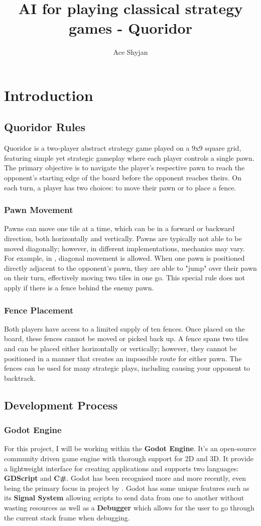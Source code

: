 \documentclass[review]{cmpreport}
\title{AI for playing classical strategy games - Quoridor}
\author{Ace Shyjan}
\begin{document}
\section{Introduction}

\subsection{Quoridor Rules}
Quoridor is a two-player abstract strategy game played on a 9x9 square grid, featuring simple yet strategic gameplay where each player controls a single pawn. The primary objective is to navigate the player's respective pawn to reach the opponent’s starting edge of the board before the opponent reaches theirs. On each turn, a player has two choices: to move their pawn or to place a fence.

\subsubsection{Pawn Movement}
Pawns can move one tile at a time, which can be in a forward or backward direction, both horizontally and vertically. Pawns are typically not able to be moved diagonally; however, in different implementations, mechanics may vary. For example, in \cite{glendenning2005mastering}, diagonal movement is allowed. When one pawn is positioned directly adjacent to the opponent's pawn, they are able to "jump" over their pawn on their turn, effectively moving two tiles in one go. This special rule does not apply if there is a fence behind the enemy pawn.

\subsubsection{Fence Placement}
Both players have access to a limited supply of ten fences. Once placed on the board, these fences cannot be moved or picked back up. A fence spans two tiles and can be placed either horizontally or vertically; however, they cannot be positioned in a manner that creates an impossible route for either pawn. The fences can be used for many strategic plays, including causing your opponent to backtrack.

\subsection{Development Process}
\subsubsection{Godot Engine}
For this project, I will be working within the \textbf{Godot Engine}. It's an open-source community driven game engine with thorough support for 2D and 3D. It provide a lightweight interface for creating applications and supports two languages: \textbf{GDScript} and \textbf{C\#}. Godot has been recognised more and more recently, even being the primary focus in project by \cite{salmela2022game}. Godot has some unique features such as its \textbf{Signal System} allowing scripts to send data from one to another without wasting resources as well as a \textbf{Debugger} which allows for the user to go through the current stack frame when debugging.
\end{document}
